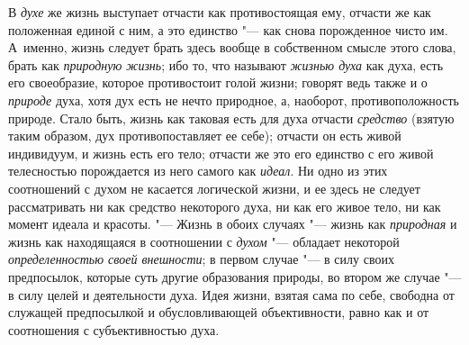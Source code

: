 В {\em духе}
же жизнь выступает отчасти как противостоящая ему, отчасти же
как положенная единой с ним, а это единство "--- как снова
порожденное чисто им. А~именно, жизнь следует брать здесь вообще в
собственном смысле этого слова, брать как
{\em природную жизнь};
ибо то, что называют
{\em жизнью духа} как
духа, есть его своеобразие, которое противостоит голой жизни; говорят ведь
также и о {\em природе}
духа, хотя дух есть не нечто природное, а, наоборот,
противоположность природе. Стало быть, жизнь как таковая есть для духа
отчасти {\em средство}
(взятую таким образом, дух противопоставляет ее себе);
отчасти он есть живой индивидуум, и жизнь есть его тело; отчасти же это его
единство с его живой телесностью порождается из него самого как
{\em идеал}. Ни одно из
этих соотношений с духом не касается логической жизни, и ее здесь не
следует рассматривать ни как средство некоторого духа, ни как его живое
тело, ни как момент идеала и красоты. "--- Жизнь в обоих
случаях "--- жизнь как
{\em природная} и жизнь
как находящаяся в соотношении с
{\em духом} "--- обладает
некоторой {\em определенностью своей
внешности}; в первом случае "--- в силу своих
предпосылок, которые суть другие образования природы, во втором же случае
"--- в силу целей и деятельности духа. Идея жизни, взятая сама
по себе, свободна от служащей предпосылкой и обусловливающей объективности,
равно как и от соотношения с субъективностью духа.

